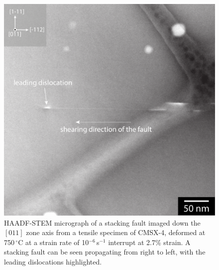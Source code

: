\documentclass[a4paper,12pt,times,numbered,print,index]{Classes/PhDThesisPSnPDF}
\begin{document}
\begin{figure}
    \centering
    \includegraphics[width=\textwidth,height=\textheight,keepaspectratio]{Figures/142041.pdf}
    \caption{HAADF-STEM micrograph of a stacking fault imaged down the $[011]$ zone axis from a tensile specimen of CMSX-4, deformed at 750\,$^\circ$C at a strain rate of 10$^{-6}$\,s$^{-1}$ interrupt at 2.7\% strain. A stacking fault can be seen propagating from right to left, with the leading dislocations highlighted.}
    \label{fig:HAADFSTEM_SFshear}
\end{figure}
\end{document}
